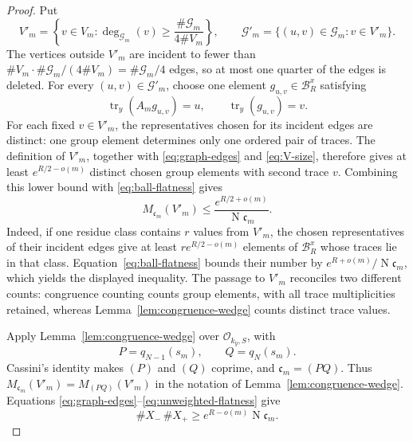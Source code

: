 \documentclass[11pt,reqno]{amsart}
\theoremstyle{definition}
\theoremstyle{remark}
\newcommand{\cO}{\mathcal O}
\newcommand{\cB}{\mathcal B}
\newcommand{\cG}{\mathcal G}
\newcommand{\Tr}{\operatorname{tr}}
\newcommand{\Norm}{\operatorname{N}}
\begin{document}
\begin{proof}
Put
\[
 V'_m=\left\{v\in V_m:
       \deg_{\cG_m}(v)\ge\frac{\#\cG_m}{4\#V_m}\right\},
 \qquad
 \cG'_m=\{(u,v)\in\cG_m:v\in V'_m\}.
\]
The vertices outside \(V'_m\) are incident to fewer than
\(\#V_m\cdot\#\cG_m/(4\#V_m)=\#\cG_m/4\) edges, so at most one quarter
of the edges is deleted.  For every
\((u,v)\in\cG'_m\), choose one element
\(g_{u,v}\in\cB_R^x\) satisfying
\[
 \Tr_y(A_mg_{u,v})=u,\qquad \Tr_y(g_{u,v})=v.
\]
For each fixed \(v\in V'_m\), the representatives chosen for its incident
edges are distinct: one group element determines only one ordered pair of
traces.  The definition of \(V'_m\), together with
\eqref{eq:graph-edges} and \eqref{eq:V-size}, therefore gives at least
\(e^{R/2-o(m)}\) distinct chosen group elements with second trace \(v\).
Combining this lower bound with \eqref{eq:ball-flatness} gives
\begin{equation}\label{eq:unweighted-flatness}
 M_{\mathfrak c_m}(V'_m)
 \le\frac{e^{R/2+o(m)}}{\Norm\mathfrak c_m}.
\end{equation}
Indeed, if one residue class contains \(r\) values from \(V'_m\), the
chosen representatives of their incident edges give at least
\(r e^{R/2-o(m)}\) elements of \(\cB_R^x\) whose traces lie in that class.
Equation~\eqref{eq:ball-flatness} bounds their number by
\(e^{R+o(m)}/\Norm\mathfrak c_m\), which yields the displayed inequality.
The passage to \(V'_m\) reconciles two different counts: congruence
counting counts group elements, with all trace multiplicities retained,
whereas Lemma~\ref{lem:congruence-wedge} counts distinct trace values.

Apply Lemma~\ref{lem:congruence-wedge} over \(\cO_{k_y,S}\), with
\[
 P=q_{N-1}(s_m),\qquad Q=q_N(s_m).
\]
Cassini's identity makes \((P)\) and \((Q)\) coprime, and
\(\mathfrak c_m=(PQ)\).  Thus
\(M_{\mathfrak c_m}(V'_m)=M_{(PQ)}(V'_m)\) in the notation of
Lemma~\ref{lem:congruence-wedge}.  Equations
\eqref{eq:graph-edges}--\eqref{eq:unweighted-flatness} give
\begin{equation}\label{eq:wedge-lower}
 \#X_-\,\#X_+
 \ge e^{R-o(m)}\Norm\mathfrak c_m.
\end{equation}


\end{proof}
\end{document}
